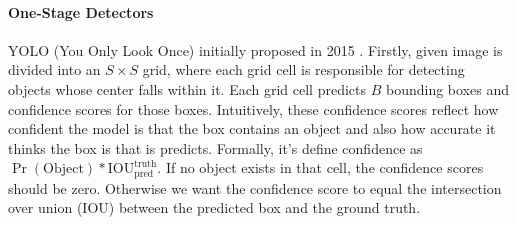 \documentclass[12pt, a4paper]{article}
\begin{document}
\paragraph{One-Stage Detectors}
\emph{}
YOLO (You Only Look Once) initially proposed in 2015 \cite{yolov1}. Firstly, given image is divided into an $S \times S$ grid,
where each grid cell is responsible for detecting objects whose center falls within it. 
Each grid cell predicts $B$ bounding boxes and confidence scores for those boxes. Intuitively, these confidence scores reflect how confident 
the model is that the box contains an object and also how accurate it thinks the box is that is predicts. Formally, it's define confidence as 
$\Pr(\text{Object}) * \text{IOU}_{\text{pred}}^{\text{truth}}$. If no object exists in that cell, the confidence scores should be zero. Otherwise we want the confidence score to equal the intersection over union (IOU) between the predicted box and the ground truth.
\end{document}

